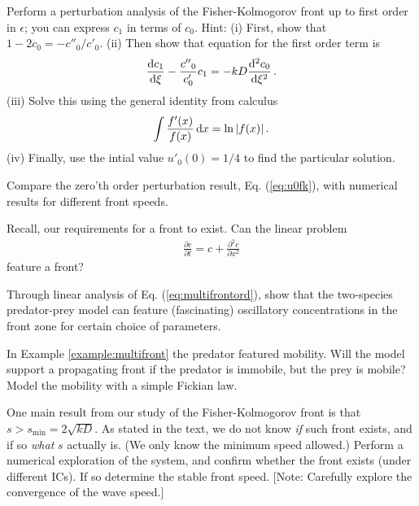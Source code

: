 \begin{exerciseregion}

	\begin{exercise}
		Perform a perturbation analysis of the Fisher-Kolmogorov front up to first
		order in $\epsilon$; you can express $c_1$ in terms of $c_0$. Hint: 
		(i) First, show that $1-2c_0=-c{''}_0/c{'}_0$. (ii) Then show that equation for the 
		first order term is
		\[
			\frac{\mathrm{d} c_1}{\mathrm{d} \xi} - \frac{c{''}_0}{c'_0}c_1 = -kD \frac{\mathrm{d}^2c_0}{\mathrm{d} \xi^2} \, .
		\]
		(iii) Solve this using the general identity from calculus
		\[
			\int \frac{f'(x)}{f(x)} \, \mathrm{d} x = \ln|f(x)| \, .
		\]
		(iv) Finally, use the intial value $u'_0(0)=1/4$ to find the particular solution.
	\end{exercise}

	\begin{exercise} \label{ex:checku0}
		Compare the zero'th order perturbation result, Eq. (\ref{eq:u0fk}), with
		numerical results for different front speeds. 
	\end{exercise}

	\begin{exercise}	
		Recall, our requirements for a front to exist. Can the linear problem
		\begin{eqnarray}
			\frac{\partial c}{\partial t}= c + \frac{\partial^2c}{\partial x^2}
		\end{eqnarray}
		feature a front? 
	\end{exercise}
	
	\begin{exercise}
		Through linear analysis of Eq. (\ref{eq:multifrontord}), show that the two-species 
		predator-prey model can feature (fascinating) oscillatory concentrations in the 
		front zone for certain choice of parameters.
	\end{exercise}

	\begin{exercise}
		In Example \ref{example:multifront}	the predator featured mobility. Will the model 
		support a propagating front if the predator is immobile, but the prey is mobile? 
		Model the mobility with a simple Fickian law.
	\end{exercise}

	\begin{exploration}
		\label{exploration:fisherKol}
		One main result from our study of the Fisher-Kolmogorov front is that
		$s > s_\text{min} = 2\sqrt{kD}$. As stated in the text, we do not know
		\emph{if} such front exists, and if so \emph{what} $s$ actually is. (We only
		know the minimum speed allowed.) Perform a numerical exploration of the
		system, and confirm whether the front exists (under different ICs). If so
		determine the stable front speed. [Note: Carefully explore the convergence of
		the wave speed.]
	\end{exploration}



\end{exerciseregion}
